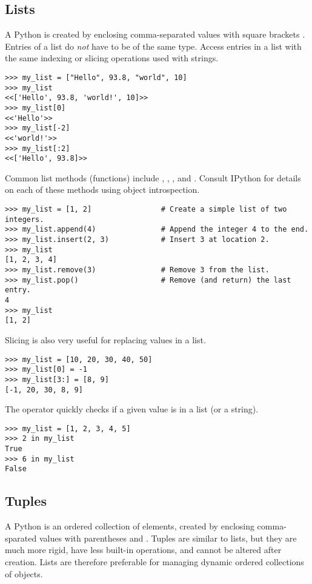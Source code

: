 
\subsection*{Lists}
A Python  is created by enclosing comma-separated values with square brackets \li{[ ]}.
Entries of a list do \emph{not} have to be of the same type.
Access entries in a list with the same indexing or slicing operations used with strings.
\begin{lstlisting}
>>> my_list = ["Hello", 93.8, "world", 10]
>>> my_list
<<['Hello', 93.8, 'world!', 10]>>
>>> my_list[0]
<<'Hello'>>
>>> my_list[-2]
<<'world!'>>
>>> my_list[:2]
<<['Hello', 93.8]>>
\end{lstlisting}

Common list methods (functions) include , , , and .
Consult IPython for details on each of these methods using object introspection.
\begin{lstlisting}
>>> my_list = [1, 2]                # Create a simple list of two integers.
>>> my_list.append(4)               # Append the integer 4 to the end.
>>> my_list.insert(2, 3)            # Insert 3 at location 2.
>>> my_list
[1, 2, 3, 4]
>>> my_list.remove(3)               # Remove 3 from the list.
>>> my_list.pop()                   # Remove (and return) the last entry.
4
>>> my_list
[1, 2]
\end{lstlisting}

Slicing is also very useful for replacing values in a list.
\begin{lstlisting}
>>> my_list = [10, 20, 30, 40, 50]
>>> my_list[0] = -1
>>> my_list[3:] = [8, 9]
[-1, 20, 30, 8, 9]
\end{lstlisting}

The  operator quickly checks if a given value is in a list (or a string).
\begin{lstlisting}
>>> my_list = [1, 2, 3, 4, 5]
>>> 2 in my_list
True
>>> 6 in my_list
False
\end{lstlisting}

\subsection*{Tuples}
A Python  is an ordered collection of elements, created by enclosing comma-sparated values with parentheses \li{(} and \li{)}.
Tuples are similar to lists, but they are much more rigid, have less built-in operations, and cannot be altered after creation.
Lists are therefore preferable for managing dynamic ordered collections of objects.

